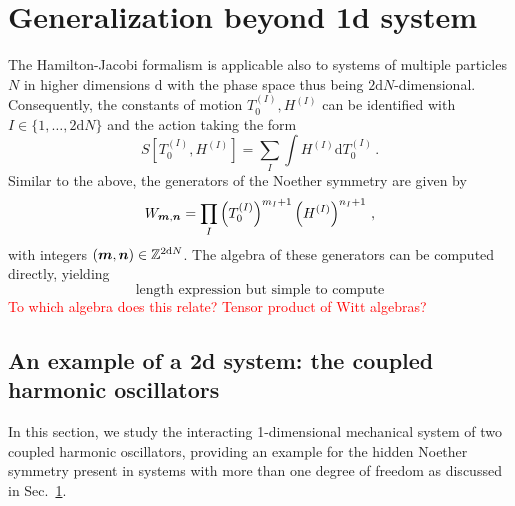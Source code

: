 \documentclass[onecolumn,notitlepage,superscriptaddress, nofootinbib,nobibnotes, aps,prd,10pt]{revtex4-1}%
\def\dd{\mathrm{d}}
\begin{document}
\section{Generalization beyond 1d system}\label{sec:Extension}

The Hamilton-Jacobi formalism is applicable also to systems of multiple particles $N$ in higher dimensions $\mathrm{d}$ with the phase space thus being $2\mathrm{d}N$-dimensional. Consequently, the constants of motion $T_0^{(I)},H^{(I)}$ can be identified with $I\in\{1,\dots, 2\mathrm{d}N\}$ and the action taking the form
%
\begin{equation}
S[T_0^{(I)},H^{(I)}] = \sum_I\int H^{(I)}\dd{T_0^{(I)}}\, .
\end{equation}
%
Similar to the above, the generators of the Noether symmetry are given by
%
\begin{equation}
    W_{\vb*{m},\vb*{n}} = \prod_I \left(T_0^{(I)}\right)^{m_I+1}\left(H^{(I)}\right)^{n_I+1}\, , 
\end{equation}
%
with integers $(\vb*{m},\vb*{n})\in\mathbb{Z}^{2\mathrm{d}N}$. The algebra of these generators can be computed directly, yielding
%
\begin{equation}
\text{length expression but simple to compute}
\end{equation}
%
\textcolor{red}{To which algebra does this relate? Tensor product of Witt algebras?}

\subsection{ An example of a 2d system: the coupled harmonic oscillators}\label{sec:coupled HOs}

In this section, we study the interacting 1-dimensional mechanical system of two coupled harmonic oscillators, providing an example for the hidden Noether symmetry present in systems with more than one degree of freedom as discussed in Sec.~\ref{sec:Extension}. 
\end{document}
